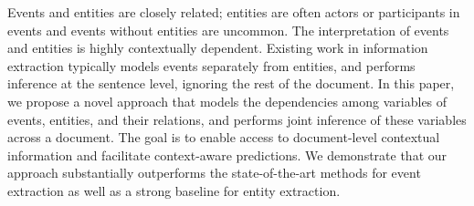 Events and entities are closely related; entities are often actors or participants in events and events without entities are uncommon. The interpretation of events and entities is highly contextually dependent. Existing work in information extraction typically models events separately from entities, and performs inference at the sentence level, ignoring the rest of the document. In this paper, we propose a novel approach that models the dependencies among variables of events, entities, and their relations, and performs joint inference of these variables across a document. The goal is to enable access to document-level contextual information and facilitate context-aware predictions. We demonstrate that our approach substantially outperforms the state-of-the-art methods for event extraction as well as a strong baseline for entity extraction.

